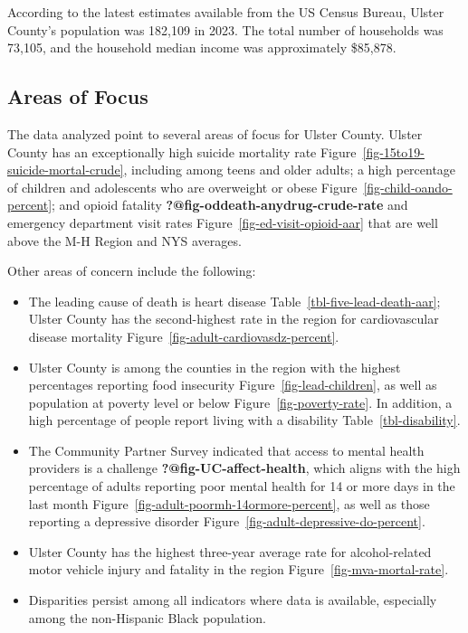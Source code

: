\documentclass[
  english,
  letterpaper,
]{report}
\providecommand{\tightlist}{%
  \setlength{\itemsep}{0pt}\setlength{\parskip}{0pt}}
\begin{document}
According to the latest estimates available from the US Census Bureau,
Ulster County's population was 182,109 in 2023. The total number of
households was 73,105, and the household median income was approximately
\$85,878.

\subsection{Areas of Focus}\label{areas-of-focus-5}

The data analyzed point to several areas of focus for Ulster County.
Ulster County has an exceptionally high suicide mortality rate
Figure~\ref{fig-15to19-suicide-mortal-crude}, including among teens and
older adults; a high percentage of children and adolescents who are
overweight or obese Figure~\ref{fig-child-oando-percent}; and opioid
fatality \textbf{?@fig-oddeath-anydrug-crude-rate} and emergency
department visit rates Figure~\ref{fig-ed-visit-opioid-aar} that are
well above the M-H Region and NYS averages.

Other areas of concern include the following:

\begin{itemize}
\tightlist
\item
  The leading cause of death is heart disease
  Table~\ref{tbl-five-lead-death-aar}; Ulster County has the
  second-highest rate in the region for cardiovascular disease mortality
  Figure~\ref{fig-adult-cardiovasdz-percent}.
\item
  Ulster County is among the counties in the region with the highest
  percentages reporting food insecurity Figure~\ref{fig-lead-children},
  as well as population at poverty level or below
  Figure~\ref{fig-poverty-rate}. In addition, a high percentage of
  people report living with a disability Table~\ref{tbl-disability}.
\item
  The Community Partner Survey indicated that access to mental health
  providers is a challenge \textbf{?@fig-UC-affect-health}, which aligns
  with the high percentage of adults reporting poor mental health for 14
  or more days in the last month
  Figure~\ref{fig-adult-poormh-14ormore-percent}, as well as those
  reporting a depressive disorder
  Figure~\ref{fig-adult-depressive-do-percent}.
\item
  Ulster County has the highest three-year average rate for
  alcohol-related motor vehicle injury and fatality in the region
  Figure~\ref{fig-mva-mortal-rate}.
\item
  Disparities persist among all indicators where data is available,
  especially among the non-Hispanic Black population.
\end{itemize}
\end{document}
